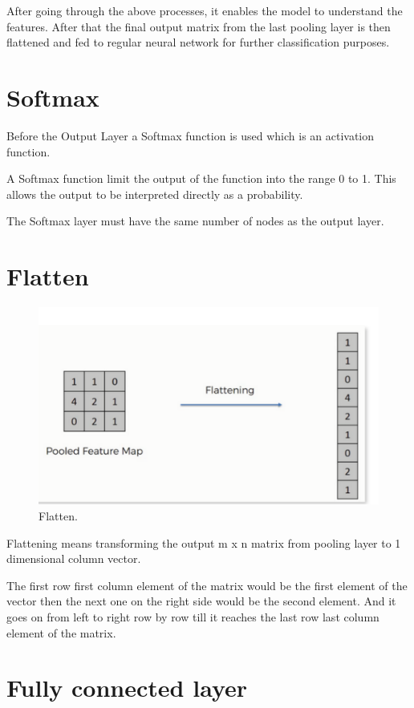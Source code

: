 \documentclass[a4paper,13pt,twoside]{book}
\begin{document}
After going through the above processes, it enables the model to understand the features. After that the final output matrix from the last pooling layer is then flattened and fed to regular neural network for further classification purposes.

\section{Softmax}

Before the Output Layer a Softmax function is used which is an activation function.

A Softmax function limit the output of the function into the range  0 to 1. This allows the output to be interpreted directly as a probability.

The Softmax layer must have the same number of nodes as the output layer.

\section{Flatten}

\begin{figure}[h!]
  \includegraphics[width=\linewidth]{Images/flatten(22).png}
  \caption{Flatten.}
  \label{fig:flatten}
\end{figure}

Flattening means transforming the output m x n matrix from pooling layer to 1 dimensional column vector.

The first row first column element of the matrix would be the first element of the vector then the next one on the right side would be the second element. And it goes on from left to right row by row till it reaches the last row last column element of the matrix.

\section{Fully connected layer}
\end{document}
